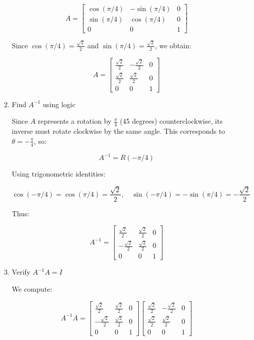 \documentclass[12pt]{article}
\begin{document}
\begin{enumerate}
\begin{enumerate}
    \[
    A =
    \begin{bmatrix}
    \cos(\pi/4) & -\sin(\pi/4) & 0 \\
    \sin(\pi/4) & \cos(\pi/4) & 0 \\
    0 & 0 & 1
    \end{bmatrix}
    \]

    Since \( \cos(\pi/4) = \frac{\sqrt{2}}{2} \) and \( \sin(\pi/4) = \frac{\sqrt{2}}{2} \), we obtain:

    \[
    A =
    \begin{bmatrix}
    \frac{\sqrt{2}}{2} & -\frac{\sqrt{2}}{2} & 0 \\
    \frac{\sqrt{2}}{2} & \frac{\sqrt{2}}{2} & 0 \\
    0 & 0 & 1
    \end{bmatrix}
    \]

    \item Find \( A^{-1} \) using logic
    
    Since \( A \) represents a rotation by \( \frac{\pi}{4} \) (45 degrees) counterclockwise, its inverse must rotate clockwise by the same angle. This corresponds to \( \theta = -\frac{\pi}{4} \), so:

    \[
    A^{-1} = R(-\pi/4)
    \]

    Using trigonometric identities:

    \[
    \cos(-\pi/4) = \cos(\pi/4) = \frac{\sqrt{2}}{2}, \quad \sin(-\pi/4) = -\sin(\pi/4) = -\frac{\sqrt{2}}{2}
    \]

    Thus:

    \[
    A^{-1} =
    \begin{bmatrix}
    \frac{\sqrt{2}}{2} & \frac{\sqrt{2}}{2} & 0 \\
    -\frac{\sqrt{2}}{2} & \frac{\sqrt{2}}{2} & 0 \\
    0 & 0 & 1
    \end{bmatrix}
    \]

    \item Verify \( A^{-1} A = I \)

    We compute:

    \[
    A^{-1} A =
    \begin{bmatrix}
    \frac{\sqrt{2}}{2} & \frac{\sqrt{2}}{2} & 0 \\
    -\frac{\sqrt{2}}{2} & \frac{\sqrt{2}}{2} & 0 \\
    0 & 0 & 1
    \end{bmatrix}
    \begin{bmatrix}
    \frac{\sqrt{2}}{2} & -\frac{\sqrt{2}}{2} & 0 \\
    \frac{\sqrt{2}}{2} & \frac{\sqrt{2}}{2} & 0 \\
    0 & 0 & 1
    \end{bmatrix}
    \]


\end{enumerate}
\end{enumerate}
\end{document}
